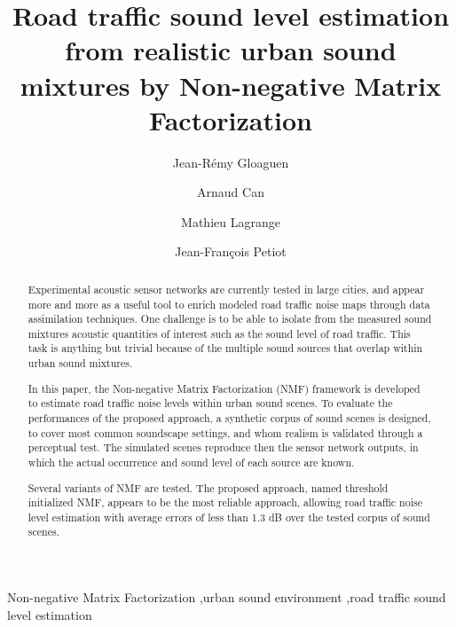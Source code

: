 \documentclass[review,5p,twocolumn,sort&compress,times]{elsarticle}
\begin{document}
\begin{frontmatter}

\title{Road traffic sound level estimation from realistic urban sound mixtures by Non-negative Matrix Factorization}

\author[ifsttar]{Jean-R\'emy Gloaguen}
\author[ifsttar]{Arnaud Can}
\author[ls2n]{Mathieu Lagrange}
\author[ls2n]{Jean-Fran\c cois Petiot}

\address[ifsttar]{Ifsttar Centre de Nantes, UMRAE, All\'ee des Ponts et Chauss\'es, 44344 Bouguenais, France}
\address[ls2n]{LS2N, 1 rue de No\"e, 44331 Nantes, France}

\begin{abstract}

Experimental acoustic sensor networks are currently tested in large cities, and appear more and more as a useful tool to enrich modeled road traffic noise maps through data assimilation techniques. One challenge is to be able to isolate from the measured sound mixtures acoustic quantities of interest such as the  sound level of road traffic. This task is anything but trivial because of the multiple sound sources that overlap within urban sound mixtures.

In this paper, the Non-negative Matrix Factorization (NMF) framework is developed to estimate road traffic noise levels within urban sound scenes. To evaluate the performances of the proposed approach, a synthetic corpus of sound scenes is designed, to cover most common soundscape settings, and whom realism is validated through a perceptual test. The simulated scenes reproduce then the sensor network outputs, in which the actual occurrence and sound level of each source are known.

Several variants of NMF are tested. The proposed approach, named threshold initialized NMF, appears to be the most reliable approach, allowing road traffic noise level estimation with average errors of less than 1.3 dB over the tested corpus of sound scenes.

\end{abstract}

\begin{keyword}
Non-negative Matrix Factorization \sep urban sound environment \sep road traffic sound level estimation
\end{keyword}

\end{frontmatter}
\end{document}
